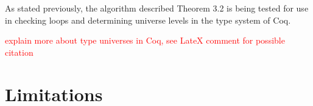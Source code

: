 As stated previously, the algorithm described Theorem 3.2 is being
tested for use in checking loops and determining universe levels in the
type system of Coq.

\textcolor{red}{explain more about type universes in Coq, see LateX comment for possible citation}

\section{Limitations}
\label{sec:limitations}

